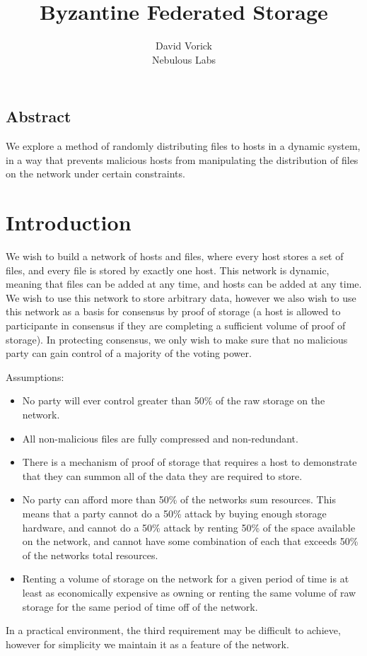 \documentclass[twocolumn]{article}
\begin{document}
\frenchspacing

\title{Byzantine Federated Storage}

\author{
{\rm David Vorick}\\
Nebulous Labs
}

\maketitle

\subsection*{Abstract}
We explore a method of randomly distributing files to hosts in a dynamic system, in a way that prevents malicious hosts from manipulating the distribution of files on the network under certain constraints.

\section{Introduction}
We wish to build a network of hosts and files, where every host stores a set of files, and every file is stored by exactly one host.
This network is dynamic, meaning that files can be added at any time, and hosts can be added at any time.
We wish to use this network to store arbitrary data, however we also wish to use this network as a basis for consensus by proof of storage (a host is allowed to participante in consensus if they are completing a sufficient volume of proof of storage).
In protecting consensus, we only wish to make sure that no malicious party can gain control of a majority of the voting power.

Assumptions:
\begin{itemize}
	\item No party will ever control greater than 50\% of the raw storage on the network.
	\item All non-malicious files are fully compressed and non-redundant.
	\item There is a mechanism of proof of storage that requires a host to demonstrate that they can summon all of the data they are required to store.
	\item No party can afford more than 50\% of the networks sum resources. This means that a party cannot do a 50\% attack by buying enough storage hardware, and cannot do a 50\% attack by renting 50\% of the space available on the network, and cannot have some combination of each that exceeds 50\% of the networks total resources.
	\item Renting a volume of storage on the network for a given period of time is at least as economically expensive as owning or renting the same volume of raw storage for the same period of time off of the network.
\end{itemize}
In a practical environment, the third requirement may be difficult to achieve, however for simplicity we maintain it as a feature of the network.
\end{document}

